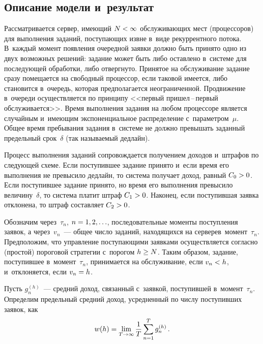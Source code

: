 \begin{multicols}{2}
\vspace*{-9pt}
  
  \section{Описание модели и~результат}
  
  \vspace*{-2pt}
  
  Рассматривается сервер, имеющий $N\hm<\infty$ обслуживающих мест 
(процессоров) для выполнения заданий, поступающих извне в~виде 
рекуррентного потока. В~каждый момент появления очередной заявки должно 
быть принято одно из двух возможных решений: задание может быть либо 
оставлено в~системе для последующей обработки, либо отвергнуто. Принятое 
на обслуживание задание сразу помещается на свободный процессор, если 
таковой имеется, либо становится в~очередь, которая предполагается 
неограниченной. Продвижение в~очереди осуществляется по принципу 
<<первый при\-шел\,--\,пер\-вый обслуживается>>. Время выполнения задания на 
любом процессоре является случайным и~имеющим экспоненциальное 
распределение с~параметром~$\mu$. Общее время пребывания задания 
в~сис\-те\-ме не должно превышать заданный предельный срок~$\delta$ (так 
называемый дедлайн).
  
  Процесс выполнения заданий сопровождается получением доходов 
и~штрафов по следующей схеме. Если поступившее задание принято и~если 
время его выполнения не превысило дедлайн, то система получает доход, 
равный $C_0\hm>0$. Если поступившее задание принято, но время его 
выполнения превысило величину~$\delta$, то система платит штраф 
$C_1\hm>0$. Наконец, если поступившая заявка отклонена, то штраф 
составляет $C_2\hm>0$.
  
  Обозначим через~$\tau_n$, $n\hm=1,2,\ldots$, последовательные моменты 
поступления заявок, а через~$v_n$~--- общее число заданий, находящихся на 
сервере\linebreak в~момент~$\tau_n$. Предположим, что управление по\-сту\-па\-ющи\-ми 
заявками осуществляется согласно (прос\-той) пороговой стратегии с~порогом 
$h\hm\geq N$. Таким образом, задание, поступившее в~момент~$\tau_n$, 
принимается на обслуживание, если $v_n\hm<h$, и~отклоняется, если 
$v_n\hm=h$.
  
  Пусть $g_n^{(h)}$~--- средний доход, связанный с~заявкой, поступившей 
в~момент~$\tau_n$. Определим предельный средний доход, усредненный по 
числу поступивших заявок, как 
  $$
  w(h) =\lim\limits_{T\to\infty} \displaystyle\frac{\displaystyle 1\mathstrut}{\displaystyle T\mathstrut}\sum\limits^T_{n=1} g_n^{(h)}\,.
  $$
  

\end{multicols}
